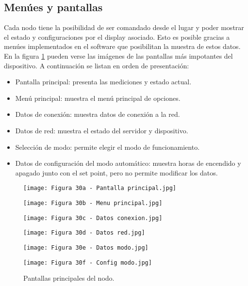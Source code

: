 \subsection{Menúes y pantallas}

Cada nodo tiene la posibilidad de ser comandado desde el lugar y poder mostrar el estado y configuraciones por el display asociado. Esto es posible gracias a menúes implementados en el software que posibilitan la muestra de estos datos. En la figura \ref{fig:30} pueden verse las imágenes de las pantallas más impotantes del dispositivo. A continuación se listan en orden de presentación:

\begin{itemize}
	\item Pantalla principal: presenta las mediciones y estado actual.
	\item Menú principal: muestra el menú principal de opciones.
	\item Datos de conexión: muestra datos de conexión a la red.
	\item Datos de red: muestra el estado del servidor y dispositivo.
	\item Selección de modo: permite elegir el modo de funcionamiento.
	\item Datos de configuración del modo automático: muestra horas de encendido y apagado junto con el set point, pero no permite modificar los datos.
\end{itemize}

\newpage

\begin{figure}[h]
\centering
\begin{minipage}{0.32\textwidth}
  \centering
  \texttt{[image: Figura 30a - Pantalla principal.jpg]}
\end{minipage}%
\begin{minipage}{0.32\textwidth}
  \centering
  \texttt{[image: Figura 30b - Menu principal.jpg]}
\end{minipage}
\begin{minipage}{0.32\textwidth}
  \centering
  \texttt{[image: Figura 30c - Datos conexion.jpg]}
\end{minipage}
\end{figure}
\begin{figure}[h]
\centering
\begin{minipage}{0.32\textwidth}
  \centering
  \texttt{[image: Figura 30d - Datos red.jpg]}
\end{minipage}
\begin{minipage}{0.32\textwidth}
  \centering
  \texttt{[image: Figura 30e - Datos modo.jpg]}
\end{minipage}
\begin{minipage}{0.32\textwidth}
  \centering
  \texttt{[image: Figura 30f - Config modo.jpg]}
\end{minipage}
\caption[Pantallas principales]{Pantallas principales del nodo.}
\label{fig:30}
\end{figure}

